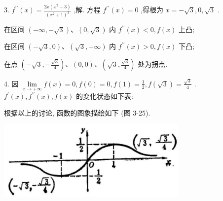 \documentclass[lang=cn,newtx,10pt,scheme=chinese]{elegantbook}
\begin{document}
3. \({f}^{\prime \prime }\left( x\right) = \frac{{2x}\left( {{x}^{2} - 3}\right) }{{\left( {x}^{2} + 1\right) }^{3}}\) ,解. 方程 \({f}^{\prime \prime }\left( x\right) = 0\) ,得根为 \(x = - \sqrt{3},0,\sqrt{3}\) .

在区间 \(\left( {-\infty , - \sqrt{3}}\right) \text{、}\left( {0,\sqrt{3}}\right)\) 内 \({f}^{\prime \prime }\left( x\right) < 0,f\left( x\right)\) 上凸;

在区间 \(\left( {-\sqrt{3},0}\right) \text{、}\left( {\sqrt{3}, + \infty }\right)\) 内 \({f}^{\prime \prime }\left( x\right) > 0,f\left( x\right)\) 下凸;

在点 \(\left( {-\sqrt{3}, - \frac{\sqrt{3}}{4}}\right) \text{、}\left( {0,0}\right) \text{、}\left( {\sqrt{3},\frac{\sqrt{3}}{4}}\right)\) 处为拐点.

4. 因 \(\mathop{\lim }\limits_{{x \rightarrow + \infty }}f\left( x\right) = 0,f\left( 0\right) = 0,f\left( 1\right) = \frac{1}{2},f\left( \sqrt{3}\right) = \frac{\sqrt{3}}{4}\) . \({f}^{\prime }\left( x\right) ,{f}^{\prime \prime }\left( x\right) ,f\left( x\right)\) 的变化状态如下表:

\begin{center}
\end{center}

根据以上的讨论, 函数的图象描绘如下 (图 3-25).

\begin{center}
\includegraphics[max width=0.7\textwidth]{images/01912c18-5c3f-733d-b775-749ba9897a9d_172_655401.jpg}
\end{center}
\end{document}
